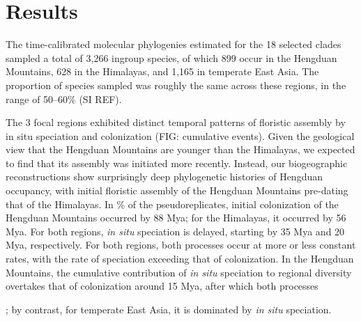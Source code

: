 \section{Results}

The time-calibrated molecular phylogenies estimated for the 18 selected clades sampled a total of 3,266 ingroup species, of which 899 occur in the Hengduan Mountains, 628 in the Himalayas, and 1,165 in temperate East Asia. The proportion of species sampled was roughly the same across these regions, in the range of 50--60\% (SI REF).

The 3 focal regions exhibited distinct temporal patterns of floristic assembly by in situ speciation and colonization (FIG: cumulative events). Given the geological view that the Hengduan Mountains are younger than the Himalayas, we expected to find that its assembly was initiated more recently. Instead, our biogeographic reconstructions show surprisingly deep phylogenetic histories of Hengduan occupancy, with initial floristic assembly of the Hengduan Mountains pre-dating that of the Himalayas. In \% of the pseudoreplicates, initial colonization of the Hengduan Mountains occurred by 88 Mya; for the Himalayas, it occurred by 56 Mya. For both regions, \textit{in situ} speciation is delayed, starting by 35 Mya and 20 Mya, respectively. For both regions, both processes occur at more or less constant rates, with the rate of speciation exceeding that of colonization. In the Hengduan Mountains, the cumulative contribution of \textit{in situ} speciation to regional diversity overtakes that of colonization around 15 Mya, after which both processes 

; by contrast, for temperate East Asia, it is dominated by \textit{in situ} speciation. 